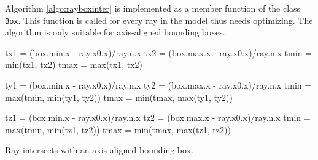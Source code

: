 Algorithm \ref{algo:rayboxinter} is implemented as a member function of the class \texttt{Box}.
This function is called for every ray in the model thus needs optimizing. The algorithm is only suitable for axis-aligned bounding boxes. 


\IncMargin{1em}
\begin{algorithm}[H] \label{algo:rayboxinter}
    \DontPrintSemicolon
    tx1 = (box.min.x - ray.x0.x)/ray.n.x\;
    tx2 = (box.max.x - ray.x0.x)/ray.n.x\;
    tmin = min(tx1, tx2)\;
    tmax = max(tx1, tx2)\;

    ty1 = (box.min.x - ray.x0.x)/ray.n.x\;
    ty2 = (box.max.x - ray.x0.x)/ray.n.x\;
    tmin = max(tmin, min(ty1, ty2))\;
    tmax = min(tmax, max(ty1, ty2))\;

    tz1 = (box.min.x - ray.x0.x)/ray.n.x\;
    tz2 = (box.max.x - ray.x0.x)/ray.n.x\;
    tmin = max(tmin, min(tz1, tz2))\;
    tmax = min(tmax, max(tz1, tz2))\;

    \caption{Ray intersects with an axis-aligned bounding box.}
\end{algorithm}
\DecMargin{1em}